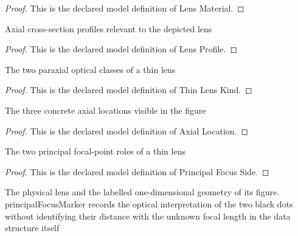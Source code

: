 \begin{proof}
  This is the declared model definition of Lens Material.
\end{proof}
\begin{definition}
  \label{def:physics:phyx-mini-0066:phyxminiproblems-problemphyxmini0066-lensprofile}
  Axial cross-section profiles relevant to the depicted lens
\end{definition}
\begin{proof}
  This is the declared model definition of Lens Profile.
\end{proof}
\begin{definition}
  \label{def:physics:phyx-mini-0066:phyxminiproblems-problemphyxmini0066-thinlenskind}
  The two paraxial optical classes of a thin lens
\end{definition}
\begin{proof}
  This is the declared model definition of Thin Lens Kind.
\end{proof}
\begin{definition}
  \label{def:physics:phyx-mini-0066:phyxminiproblems-problemphyxmini0066-axiallocation}
  The three concrete axial locations visible in the figure
\end{definition}
\begin{proof}
  This is the declared model definition of Axial Location.
\end{proof}
\begin{definition}
  \label{def:physics:phyx-mini-0066:phyxminiproblems-problemphyxmini0066-principalfocusside}
  The two principal focal-point roles of a thin lens
\end{definition}
\begin{proof}
  This is the declared model definition of Principal Focus Side.
\end{proof}
\begin{definition}
  \label{def:physics:phyx-mini-0066:phyxminiproblems-problemphyxmini0066-concavelenssetup}
  The physical lens and the labelled one-dimensional geometry of its figure. principalFocusMarker records the optical interpretation of the two black dots without identifying their distance with the unknown focal length in the data structure itself
\end{definition}

